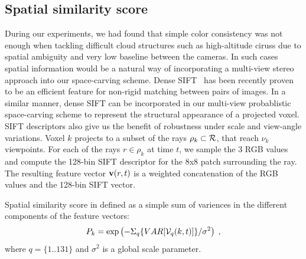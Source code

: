 \documentclass[runningheads]{llncs}
\begin{document}
\subsection*{Spatial similarity score}
\label{sec:appearancecore}

During our experiments, we had found that simple color consistency was not enough when tackling difficult cloud structures such as high-altitude ciruss due to spatial ambiguity and very low baseline between the cameras. In such cases spatial information would be a natural way of incorporating a multi-view stereo approach into our space-carving scheme.
Dense SIFT~\cite{DenseSift2011} has been recently proven to be an efficient feature for non-rigid matching between pairs of images.
In a similar manner, dense SIFT can be incorporated in our multi-view probablistic space-carving scheme to represent the structural appearance of a projected voxel. SIFT descriptors also give us the benefit of robustness under scale and view-angle variations.
Voxel $k$ projects to a subset of the rays $\rho_k\subset{\cal R}$,
that reach $\nu_k$ viewpoints.
For each of the rays $r\in\rho_k$ at time $t$, we sample the 3 RGB values and compute the 128-bin SIFT descriptor for the 8x8 patch surrounding the ray.
The resulting feature vector ${\bf v}(r,t)$ is a weighted concatenation of the RGB values and the 128-bin SIFT vector.

Spatial similarity score in defined as a simple sum of variences in the different components of the feature vectors:
\begin{equation}
 P_k= \exp\left(
         -\Sigma_q\{VAR[{\cal V}_q(k,t)]\}/\sigma^2
         \right)
  \;,
 \label{eq:Dist}
\end{equation}
where $q=\{1..131\}$ and $\sigma^2$ is a global scale parameter.







\end{document}
